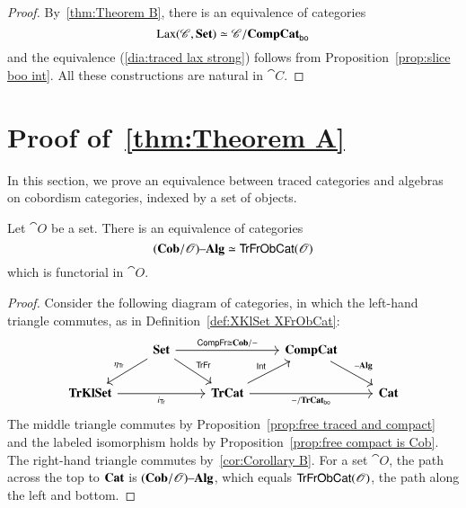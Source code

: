 \documentclass[12pt,oneside,article,draft]{memoir}
\begin{document}
\begin{proof}

By~\ref{thm:Theorem B}, there is an equivalence of categories 
$$\operatorname{Lax}(\mathscr{C},\mathbf{Set})\simeq\mathscr{C}/\mathbf{CompCat}_{\mathsf{bo}}$$
and the equivalence (\ref{dia:traced lax strong}) follows from Proposition~\ref{prop:slice boo int}. All these constructions are natural in $\cat{C}$. 

\end{proof}

\section{Proof of~\ref{thm:Theorem A}}\label{sec:proof of A}

In this section, we prove an equivalence between traced categories and algebras on cobordism categories, indexed by a set of objects. 

\begin{proposition}\label{prop:natural equivalence cob-O and traced-O}

Let $\cat{O}$ be a set. There is an equivalence of categories 
$$(\mathbf{Cob}/\mathscr{O}){\text \textendash}\mathbf{Alg}\simeq\mathsf{TrFrObCat}(\mathscr{O})$$
which is functorial in $\cat{O}$.

\end{proposition}

\begin{proof}

Consider the following diagram of categories, in which the left-hand triangle commutes, as in Definition~\ref{def:XKlSet XFrObCat}:
$$
\begin{tikzcd}
&\Set\ar[rr,"\Fun{CompFr}\iso\Cat{Cob/-}"]\ar[dl,"\eta_{\Fun{Tr}}"']\ar[dr,"\Fun{TrFr}"]&&\Cat{CompCat}\ar[dr,"\alg"]\\
\Cat{TrKlSet}\ar[rr,"i_{\Fun{Tr}}"']&&\Cat{TrCat}\ar[ur,"\Fun{Int}"]\ar[rr,"-/\TrCat_{\bo}"']&&\Cat{Cat}
\end{tikzcd}
$$
The middle triangle commutes by Proposition~\ref{prop:free traced and compact} and the labeled isomorphism holds by Proposition~\ref{prop:free compact is Cob}. The right-hand triangle commutes by~\ref{cor:Corollary B}. For a set $\cat{O}$, the path across the top to $\mathbf{Cat}$ is $(\mathbf{Cob}/\mathscr{O}){\text \textendash}\mathbf{Alg}$, which equals $\mathsf{TrFrObCat}(\mathscr{O})$, the path along the left and bottom.

\end{proof}
\end{document}
